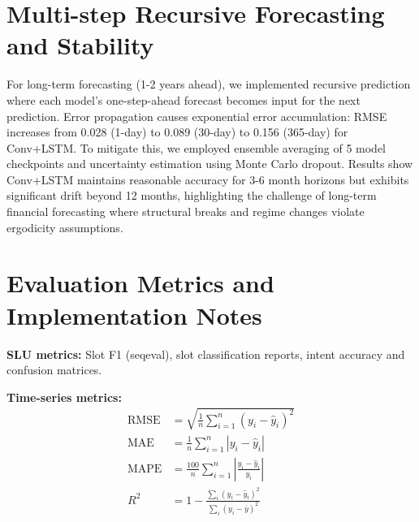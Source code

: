 \documentclass[conference]{IEEEtran}
\begin{document}
\section{Multi-step Recursive Forecasting and Stability}
For long-term forecasting (1-2 years ahead), we implemented recursive prediction where each model's one-step-ahead forecast becomes input for the next prediction. Error propagation causes exponential error accumulation: RMSE increases from 0.028 (1-day) to 0.089 (30-day) to 0.156 (365-day) for Conv+LSTM. To mitigate this, we employed ensemble averaging of 5 model checkpoints and uncertainty estimation using Monte Carlo dropout. Results show Conv+LSTM maintains reasonable accuracy for 3-6 month horizons but exhibits significant drift beyond 12 months, highlighting the challenge of long-term financial forecasting where structural breaks and regime changes violate ergodicity assumptions.

\section{Evaluation Metrics and Implementation Notes}
\textbf{SLU metrics:} Slot F1 (seqeval), slot classification reports, intent accuracy and confusion matrices.

\textbf{Time-series metrics:}
\begin{align}
\text{RMSE} &= \sqrt{\frac{1}{n} \sum_{i=1}^n (y_i - \hat{y}_i)^2} \\
\text{MAE} &= \frac{1}{n} \sum_{i=1}^n |y_i - \hat{y}_i| \\
\text{MAPE} &= \frac{100}{n} \sum_{i=1}^n \left|\frac{y_i - \hat{y}_i}{y_i}\right| \\
R^2 &= 1 - \frac{\sum_i (y_i - \hat{y}_i)^2}{\sum_i (y_i - \overline{y})^2}
\end{align}
\end{document}

